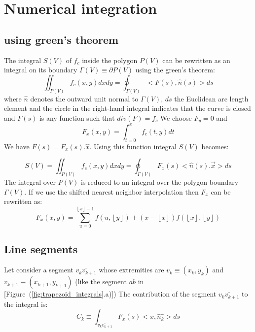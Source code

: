 \documentclass[11pt]{article}
\newcommand{\fig}[1]{[Figure~(#1)]}
\begin{document}
    
\section{Numerical integration} 

\subsection{using green's theorem}

The integral $S(V)$ of $f_c$ inside the polygon $P(V)$ can be rewritten as an integral on its boundary $\Gamma(V)\equiv \partial P(V)$ using the green's theorem:
 \begin{equation}
 \iint_{P(V)} f_c(x,y)dxdy=\oint_{\Gamma(V)}<F(s), \hat{n}(s)>ds
 \end{equation}
where $\hat{n}$ denotes the outward unit normal to $\Gamma(V)$, $ds$ the Euclidean arc length element and the circle in the right-hand integral indicates that the curve is closed and $F(s)$ is any function such that 
$div(F)=f_c$ 
 We choose  $F_y=0$ and  
 \begin{equation}F_x(x,y)=\int_{t=0}^x f_c(t, y)dt
 \label{eqn:Fx_definition}
 \end{equation} We have $F(s)=F_x(s).\hat{x}$. 
Using this function integral $S(V)$ becomes:

 \begin{equation}
 S(V)=\iint_{P(V)} f_c(x,y)dxdy=\oint_{\Gamma(V)} F_x(s) <\hat{n}(s).\vec{x}>ds
  \label{eqn:matching_cost_green}
 \end{equation}
The integral over $P(V)$ is reduced to an integral over the polygon boundary  $\Gamma(V)$.
If we use the shifted nearest neighbor interpolation then $F_x$ can be rewritten as:  
 \begin{equation}
F_x(x,y)=\sum_{u=0}^{\left\lfloor x\right\rfloor-1}f(u,\left\lfloor y\right\rfloor)+(x-\left\lfloor x\right\rfloor)f(\left\lfloor x\right\rfloor,\left\lfloor y\right\rfloor)
\label{eqn:FuNearestNeighbor}
\end{equation} 

\subsection{Line segments}
%
%
%

Let consider a segment $\overline{v_k v_{k+1}}$ whose extremities are $v_k\equiv(x_k,y_k)$ and $v_{k+1}\equiv(x_{k+1},y_{k+1})$ (like the segment $\overline{ab}$ in \fig{\ref{fig:trapezoid_integrals}.a}) The contribution of the segment $\overline{v_k v_{k+1}}$ to the integral is:
\begin{equation} 
C_k\equiv \int_{\overline{v_k v_{k+1}}} F_x(s)<\hat{x},\hat{n_k}> ds
\end{equation}
\end{document}
